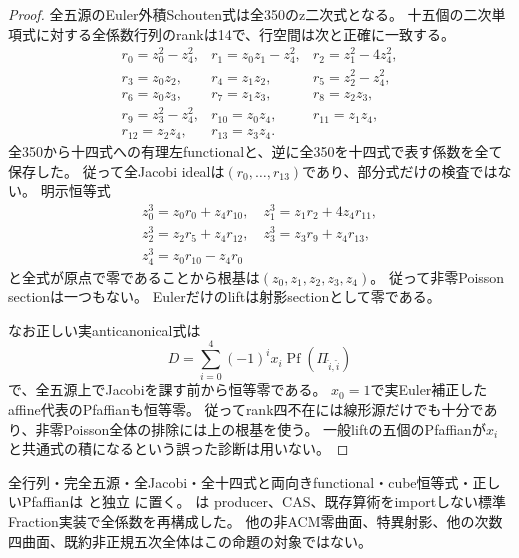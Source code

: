 \documentclass[a4paper,11pt]{ltjsarticle}
\theoremstyle{definition}
\begin{document}
\begin{proof}
全五源のEuler外積Schouten式は全350のz二次式となる。
十五個の二次単項式に対する全係数行列のrankは14で、行空間は次と正確に一致する。
\[
\begin{array}{lll}
 r_0=z_0^2-z_4^2,&r_1=z_0z_1-z_4^2,&r_2=z_1^2-4z_4^2,\\
 r_3=z_0z_2,&r_4=z_1z_2,&r_5=z_2^2-z_4^2,\\
 r_6=z_0z_3,&r_7=z_1z_3,&r_8=z_2z_3,\\
 r_9=z_3^2-z_4^2,&r_{10}=z_0z_4,&r_{11}=z_1z_4,\\
 r_{12}=z_2z_4,&r_{13}=z_3z_4.&
\end{array}
\]
全350から十四式への有理左functionalと、逆に全350を十四式で表す係数を全て保存した。
従って全Jacobi idealは$(r_0,\ldots,r_{13})$であり、部分式だけの検査ではない。
明示恒等式
\[
\begin{gathered}
 z_0^3=z_0r_0+z_4r_{10},\quad z_1^3=z_1r_2+4z_4r_{11},\\
 z_2^3=z_2r_5+z_4r_{12},\quad z_3^3=z_3r_9+z_4r_{13},\\
 z_4^3=z_0r_{10}-z_4r_0
\end{gathered}
\]
と全式が原点で零であることから根基は$(z_0,z_1,z_2,z_3,z_4)$。
従って非零Poisson sectionは一つもない。
Eulerだけのliftは射影sectionとして零である。

なお正しい実anticanonical式は
\[
 D=\sum_{i=0}^4(-1)^ix_i\operatorname{Pf}(\Pi_{\widehat i,\widehat i})
\]
で、全五源上でJacobiを課す前から恒等零である。
$x_0=1$で実Euler補正したaffine代表のPfaffianも恒等零。
従ってrank四不在には線形源だけでも十分であり、非零Poisson全体の排除には上の根基を使う。
一般liftの五個のPfaffianが$x_i$と共通式の積になるという誤った診断は用いない。
\end{proof}
全行列・完全五源・全Jacobi・全十四式と両向きfunctional・cube恒等式・正しいPfaffianは
と独立
に置く。
は
producer、CAS、既存算術をimportしない標準Fraction実装で全係数を再構成した。
他の非ACM零曲面、特異射影、他の次数四曲面、既約非正規五次全体はこの命題の対象ではない。
\end{document}
